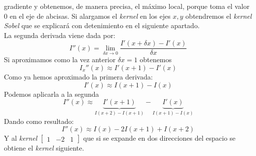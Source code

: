 gradiente y obtenemos, de manera precisa, el máximo local, porque toma el
valor $0$ en el eje de abcisas. Si alargamos el \emph{kernel} en los
ejes $x, y$ obtendremos el \emph{kernel}
\emph{Sobel} que se explicará con detenimiento en el siguiente apartado. \\
La segunda derivada viene dada por:
\begin{equation*}
  I''(x) = \lim_{\delta x \to 0}\frac{I'(x+\delta x) - I'(x)}{\delta x}
\end{equation*}
Si aproximamos como la vez anterior $\delta x = 1$ obtenemos
\begin{equation*}
  I_x''(x) \approx I'(x + 1) - I'(x)
\end{equation*}
Como ya hemos aproximado la primera derivada:
\begin{equation*}
  I'(x) \approx I(x + 1) - I(x)
\end{equation*}
Podemos aplicarla a la segunda
\begin{equation*}
  I''(x) \approx \underbrace{I'(x + 1)}_{I(x + 2) - I(x + 1)} - \underbrace{I'(x)}_{I(x + 1) - I(x)}
\end{equation*}
Dando como resultado:
\begin{equation*}
  I''(x) \approx I(x) - 2I(x + 1) + I(x + 2)
\end{equation*}
Y al \emph{kernel} $\begin{bmatrix} 1 & -2 & 1 \end{bmatrix}$ que si
se expande en dos direcciones del espacio se obtiene el \emph{kernel} siguiente.
